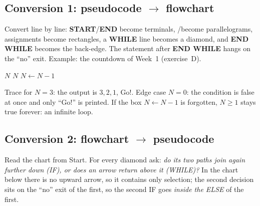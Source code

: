 \documentclass[11pt,a4paper]{article}
\begin{document}
\subsection{Conversion 1: pseudocode $\to$ flowchart}
Convert line by line: \textbf{START}/\textbf{END} become terminals, \READ/\PRINT become parallelograms, assignments become rectangles, a \textbf{WHILE} line becomes a diamond, and \textbf{END WHILE} becomes the back-edge. The statement after \textbf{END WHILE} hangs on the ``no'' exit. Example: the countdown of Week~1 (exercise~D).

\begin{center}
\begin{minipage}[c]{0.36\linewidth}
\begin{pseudobox}
\begin{algorithmic}[1]
\START
\State \READ $N$
  \State \PRINT $N$
  \State $N \gets N - 1$
\EndWhileX
\State \PRINT {}
\STOP
\end{algorithmic}
\end{pseudobox}
\end{minipage}\hfill
\begin{minipage}[c]{0.58\linewidth}\centering
{}
\end{minipage}
\end{center}
Trace for $N=3$: the output is $3, 2, 1$, Go!. Edge case $N=0$: the condition is false at once and only ``Go!'' is printed. If the box $N \gets N-1$ is forgotten, $N\ge1$ stays true forever: an infinite loop.

\subsection{Conversion 2: flowchart $\to$ pseudocode}\label{sec:conv2}
Read the chart from Start. For every diamond ask: \emph{do its two paths join again further down (IF), or does an arrow return above it (WHILE)?} In the chart below there is no upward arrow, so it contains only selection; the second decision sits on the ``no'' exit of the first, so the second IF goes \emph{inside the ELSE} of the first.
\end{document}
